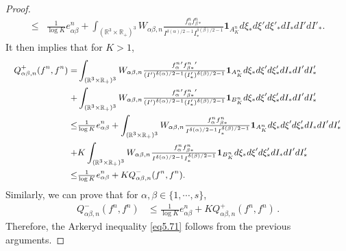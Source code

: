 \documentclass[reqno,11pt]{amsart}
\numberwithin{equation}{section}
\def\R{\mathbb{R}}
\begin{document}
\begin{proof}
{\begin{align*}
			\leq & \tfrac{1}{\log K} e^n_{\alpha \beta }  + \int_{(\R^3\times \R_+)^3} W_{\alpha \beta,n }\tfrac{f^n_\alpha f^n_{\beta *}}{I^{\delta(\alpha)/2-1} I_*^{\delta(\beta)/2-1}} \mathbf{1}_{A^n_K} d\xi_* d\xi' d\xi'_* dI_* dI'dI'_* .
		\end{align*}}
It then implies that for $K > 1$,
	\begin{equation*}{\small
		\begin{aligned}
			Q^+_{\alpha \beta ,n} (f^n,f^n) 
			=& \int_{(\R^3\times \R_+)^3} W_{\alpha \beta,n } \tfrac{ f_{\alpha} ^{n}{'} f_{\beta *}^{n}{'} }{(I')^{\delta (\alpha)/2-1} (I'_*)^{\delta(\beta)/2-1} } \mathbf{1}_{A^n_K} d\xi_* d\xi' d\xi'_* dI_* dI'dI'_*\\
			+ & \int_{(\R^3\times \R_+)^3} W_{\alpha \beta,n } \tfrac{ f_{\alpha} ^{n}{'} f_{\beta *}^{n}{'} }{(I')^{\delta (\alpha)/2-1} (I'_*)^{\delta(\beta)/2-1} } \mathbf{1}_{B^n_K} d\xi_* d\xi' d\xi'_* dI_* dI'dI'_* \\
			\leq & \tfrac{1}{\log K} e^n_{\alpha \beta }  + \int_{(\R^3\times \R_+)^3} W_{\alpha \beta,n } \tfrac{f^n_\alpha f^n_{\beta *}}{I^{\delta(\alpha)/2-1} I_*^{\delta(\beta)/2-1}} \mathbf{1}_{A^n_K} d\xi_* d\xi' d\xi'_* dI_* dI'dI'_* \\
			+ & K\int_{(\R^3\times \R_+)^3} W_{\alpha \beta,n }\tfrac{f^n_\alpha f^n_{\beta *}}{I^{\delta(\alpha)/2-1} I_*^{\delta(\beta)/2-1}} \mathbf{1}_{B^n_K} d\xi_* d\xi' d\xi'_* dI_* dI'dI'_* \\
			\leq & \tfrac{1}{\log K} e^n_{\alpha \beta } +K Q^-_{\alpha \beta ,n} (f^n,f^n) .
		\end{aligned}}
	\end{equation*}
	Similarly, we can prove that for $\alpha, \beta \in \{ 1,\cdots,s \}$,
	\begin{equation*}
	\begin{aligned}
	Q^-_{\alpha \beta ,n} (f^n,f^n) &\leq \tfrac{1}{\log K}e^n_{\alpha \beta } +K Q^+_{\alpha \beta ,n} (f^n,f^n) \,.
	\end{aligned}
	\end{equation*}
Therefore, the Arkeryd inequality \eqref{eq5.71} follows from the previous arguments.
	

\end{proof}
\end{document}
